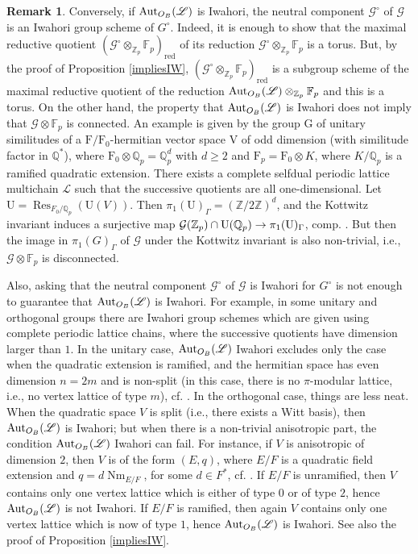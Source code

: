 \documentclass[reqno, 10pt]{amsart}
\makeatletter
\newcommand{\BF}{\ensuremath{\mathbb {F}}\xspace}
\newcommand{\BQ}{\ensuremath{\mathbb {Q}}\xspace}
\newcommand{\BZ}{\ensuremath{\mathbb {Z}}\xspace}
\newcommand{\CG}{\ensuremath{\mathcal {G}}\xspace}
\newcommand{\CL}{\ensuremath{\mathcal {L}}\xspace}
\newcommand{\RF}{\ensuremath{\mathrm {F}}\xspace}
\newcommand{\RG}{\ensuremath{\mathrm {G}}\xspace}
\newcommand{\RV}{\ensuremath{\mathrm {V}}\xspace}
\DeclareMathOperator{\Nm}{Nm}
\newcommand{\red}{\ensuremath{\mathrm{red}}\xspace}
\DeclareMathOperator{\Res}{Res}
\newcommand{\U}{\mathrm{U}}
\theoremstyle{definition}
\newtheorem{remark}[subsubsection]{Remark}
\numberwithin{equation}{subsection}
\numberwithin{subsubsection}{subsection}
\renewcommand{\to}{%
   \ifbool{@display}{\longrightarrow}{\rightarrow}%
   }
\makeatother
\begin{document}
\begin{remark}\label{rem:IW}
 Conversely, if ${\rm Aut}_{O_B}(\mathscr L)$ is Iwahori, the neutral component $\CG^\circ$ of $\CG$ is an Iwahori group scheme of $G^\circ$. Indeed,  it is enough to show that the maximal reductive quotient $(\CG^\circ\otimes_{\BZ_p}\BF_p)_{\red}$ of its reduction $\CG^\circ\otimes_{\BZ_p}\BF_p$ is a torus. But, by  the proof of Proposition \ref{impliesIW},  $(\CG^\circ\otimes_{\BZ_p}\BF_p)_{\red}$ is a subgroup scheme of the maximal reductive quotient of the reduction  ${\rm Aut}_{O_B}(\mathscr L)\otimes_{\BZ_p}\BF_p$ and this
 is a torus.  On the other hand, the property that  ${\rm Aut}_{O_B}(\mathscr L)$ is Iwahori does not imply that $\CG\otimes\BF_p$ is connected.  An example is given by the group $\RG$ of unitary similitudes of a $\RF/\RF_0$-hermitian vector space $\RV$ of odd dimension (with similitude factor in $\BQ^*$), where $\RF_0\otimes\BQ_p=\BQ_p^d$ with $d\geq 2$ and $\RF_p=\RF_0\otimes K$, where $K/\BQ_p$ is a ramified quadratic extension. There exists a complete selfdual periodic lattice multichain $\CL$ such that the successive quotients are all one-dimensional. Let $\U=\Res_{F_0/\BQ_p}(\U(V))$. Then $\pi_1(\U)_\Gamma=(\BZ/2\BZ)^d$, and the Kottwitz invariant induces a surjective map $\CG(\BZ_p)\cap \U(\BQ_p)\to  \pi_1(\U)_\Gamma$, comp. \cite[p. 132]{PRtw}. But then the image in $\pi_1(G)_\Gamma$ of $\CG$ under the Kottwitz invariant is also non-trivial, i.e., $\CG\otimes\BF_p$ is disconnected. 
 

  
  
  Also, asking that the neutral component $\CG^\circ$ of $\CG$ is Iwahori for $G^\circ$ is not enough to guarantee that ${\rm Aut}_{O_B}(\mathscr L)$ is Iwahori.  
For example, in some unitary and orthogonal groups there are Iwahori group schemes which are given using complete periodic lattice chains, where the successive quotients have dimension larger than $1$.  In the unitary case, ${\rm Aut}_{O_B}(\mathscr L)$ Iwahori excludes only the case when the quadratic extension is ramified, and the hermitian space has even dimension $n=2m$ and is non-split (in this case, there is no $\pi$-modular lattice, i.e., no vertex lattice of type $m$), cf. \cite{Jac}. In the orthogonal case, things are less neat. When the quadratic space $V$ is split (i.e., there exists a Witt basis), then ${\rm Aut}_{O_B}(\mathscr L)$ is Iwahori;  but when there is a non-trivial anisotropic part, the condition ${\rm Aut}_{O_B}(\mathscr L)$ Iwahori can fail. For instance, if  $V$ is anisotropic of dimension $2$, then $V$ is of the form $(E, q)$, where $E/F$  is a quadratic field extension and $q= d \Nm_{E/F}$, for some $d\in F^*$, cf. \cite[\S 2.2.2]{HZ}.  If  $E/F$ is  unramified, then $V$ contains only one vertex lattice which is either of type $0$ or of type $2$, hence ${\rm Aut}_{O_B}(\mathscr L)$ is not Iwahori.  If $E/F$ is ramified, then again $V$ contains only one vertex lattice which is now of type $1$, hence ${\rm Aut}_{O_B}(\mathscr L)$ is  Iwahori.  See also the proof of Proposition \ref{impliesIW}.
 \end{remark}
\end{document}
